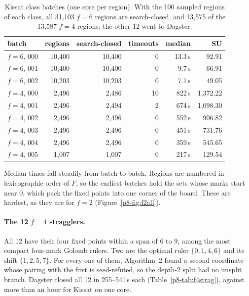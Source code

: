 \documentclass[11pt,a4paper,oneside]{report}
\theoremstyle{definition}
\begin{document}
\begin{table}[H]
\centering
\begin{tabular}{@{}lrrrrr@{}}
\toprule
batch & regions & search-closed & timeouts & median & SU \\
\midrule
$f=6$, 000 & 10{,}400 & 10{,}400 & 0 & 13.3\,s & 92.91 \\
$f=6$, 001 & 10{,}400 & 10{,}400 & 0 & 9.7\,s & 66.91 \\
$f=6$, 002 & 10{,}203 & 10{,}203 & 0 & 7.1\,s & 49.05 \\
\midrule
$f=4$, 000 & 2{,}496 & 2{,}486 & 10 & 822\,s & 1{,}372.22 \\
$f=4$, 001 & 2{,}496 & 2{,}494 & 2 & 674\,s & 1{,}098.30 \\
$f=4$, 002 & 2{,}496 & 2{,}496 & 0 & 552\,s & 906.82 \\
$f=4$, 003 & 2{,}496 & 2{,}496 & 0 & 451\,s & 731.76 \\
$f=4$, 004 & 2{,}496 & 2{,}496 & 0 & 359\,s & 545.65 \\
$f=4$, 005 & 1{,}007 & 1{,}007 & 0 & 217\,s & 129.54 \\
\bottomrule
\end{tabular}
\caption{Kissat class batches (one core per region). With the 100 sampled regions of each
class, all 31{,}103 $f=6$ regions are search-closed, and 13{,}575 of the 13{,}587 $f=4$
regions; the other 12 went to Dagster.}
\label{p8-tab:bulk}
\end{table}

Median times fall steadily from batch to batch. Regions are numbered in lexicographic order of
$F$, so the earliest batches hold the sets whose marks start near 0, which pack the fixed
points into one corner of the board. These are hardest, as they are for $f=2$
(Figure~\ref{p8-fig:f2all}).

\paragraph{The 12 $f=4$ stragglers.} All 12 have their four fixed points within a span of 6 to
9, among the most compact four-mark Golomb rulers. Two are the optimal ruler $\{0,1,4,6\}$
and its shift $\{1,2,5,7\}$. For every one of them, Algorithm~2 found a second coordinate whose
pairing with the first is seed-refuted, so the depth-2 split had no unsplit branch. Dagster
closed all 12 in 255--541\,s each (Table~\ref{p8-tab:f4strag}), against more than an hour for
Kissat on one core.
\end{document}
